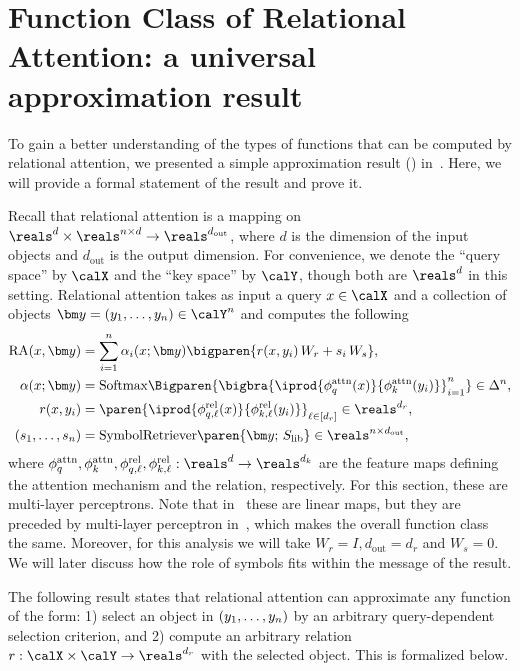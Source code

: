 \section{Function Class of Relational Attention: a universal approximation result}\label{sec:approx}

To gain a better understanding of the types of functions that can be computed by relational attention, we presented a simple approximation result () in~. Here, we will provide a formal statement of the result and prove it.

Recall that relational attention is a mapping on $\reals^d \times \reals^{n \times d} \to \reals^{d_{\mathrm{out}}}$, where $d$ is the dimension of the input objects and $d_{\mathrm{out}}$ is the output dimension. For convenience, we denote the ``query space'' by $\calX$ and the ``key space'' by $\calY$, though both are $\reals^d$ in this setting. Relational attention takes as input a query $x \in \calX$ and a collection of objects $\y = \ys \in \calY^n$ and computes the following
\begin{align}
  \RA(x, \y) &= \sum_{i=1}^{n} \alpha_i(x; \y) \bigparen{r(x, y_i) \, W_r +  s_i \, W_s}, \\
  \alpha(x; \y) &= \Softmax\Bigparen{\bigbra{\iprod{\phiqattn(x)}{\phikattn(y_i)}}_{i=1}^{n}} \in \Delta^n, \\
  r(x, y_i) &= \paren{\iprod{\phi_{q,\ell}^{\rel}(x)}{\phi_{k,\ell}^{\rel}(y_i)}}_{\ell \in [d_r]} \in \reals^{d_r}, \\
  (s_1, \ldots, s_n) &= \SymbolRetriever\paren{\y;\, \Slib} \in \reals^{n \times d_{\mathrm{out}}},
\end{align}
where $\phiqattn, \phikattn, \phi_{q,\ell}^{\rel}, \phi_{k,\ell}^{\rel}: \reals^{d} \to \reals^{d_k}$ are the feature maps defining the attention mechanism and the relation, respectively. For this section, these are multi-layer perceptrons. Note that in~ these are linear maps, but they are preceded by multi-layer perceptron in~, which makes the overall function class the same. Moreover, for this analysis we will take $W_r = I, d_{\mathrm{out}} = d_r$ and $W_s = 0$. We will later discuss how the role of symbols fits within the message of the result.

The following result states that relational attention can approximate any function of the form: 1) select an object in $(y_1, \ldots, y_n)$ by an arbitrary query-dependent selection criterion, and 2) compute an arbitrary relation $r: \calX \times \calY \to \reals^{d_r}$ with the selected object. This is formalized below.


